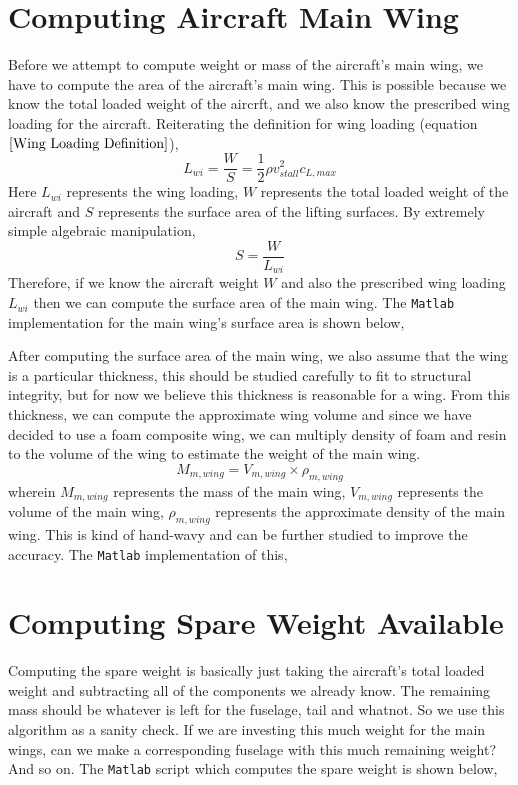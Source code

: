 \documentclass[letter, 12pt]{article}
\begin{document}
\begin{center}
\section{Computing Aircraft Main Wing}
\begin{comment}
\end{comment}
Before we attempt to compute weight or mass of the aircraft's main wing, we have to compute the area of the aircraft's main wing. This is possible because we know the total loaded weight of the aircrft, and we also know the prescribed wing loading for the aircraft. Reiterating the definition for wing loading (equation $\ref{Wing Loading Definition}$),
$$L_{wi} = \frac{W}{S} = \frac{1}{2}\rho v_{stall}^{2} c_{L,max}$$
Here $L_{wi}$ represents the wing loading, $W$ represents the total loaded weight of the aircraft and $S$ represents the surface area of the lifting surfaces. By extremely simple algebraic manipulation,
$$S = \frac{W}{L_{wi}}$$
Therefore, if we know the aircraft weight $W$ and also the prescribed wing loading $L_{wi}$ then we can compute the surface area of the main wing. The \texttt{Matlab} implementation for the main wing's surface area is shown below,

After computing the surface area of the main wing, we also assume that the wing is a particular thickness, this should be studied carefully to fit to structural integrity, but for now we believe this thickness is reasonable for a wing. From this thickness, we can compute the approximate wing volume and since we have decided to use a foam composite wing, we can multiply density of foam and resin to the volume of the wing to estimate the weight of the main wing.
$$M_{m,wing} = V_{m,wing}\times\rho_{m,wing}$$
wherein $M_{m,wing}$ represents the mass of the main wing, $V_{m,wing}$ represents the volume of the main wing, $\rho_{m,wing}$ represents the approximate density of the main wing. This is kind of hand-wavy and can be further studied to improve the accuracy. The \texttt{Matlab} implementation of this,


\section{Computing Spare Weight Available}
\begin{comment}
\end{comment}
Computing the spare weight is basically just taking the aircraft's total loaded weight and subtracting all of the components we already know. The remaining mass should be whatever is left for the fuselage, tail and whatnot. So we use this algorithm as a sanity check. If we are investing this much weight for the main wings, can we make a corresponding fuselage with this much remaining weight? And so on. The \texttt{Matlab} script which computes the spare weight is shown below,



\end{center}
\end{document}
